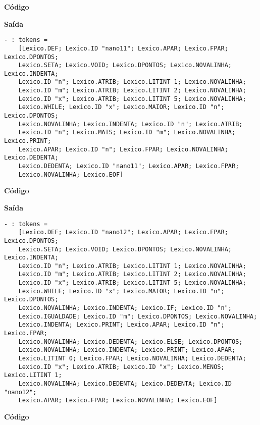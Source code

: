 \documentclass[hidelinks,12pt]{article}
\begin{document}
	{\large \textbf{Código} }
			
	
	{\large \textbf{Saída}}
	
	\begin{lstlisting}[caption=Analisador Léxico]
	- : tokens =
	[Lexico.DEF; Lexico.ID "nano11"; Lexico.APAR; Lexico.FPAR; Lexico.DPONTOS;
	Lexico.SETA; Lexico.VOID; Lexico.DPONTOS; Lexico.NOVALINHA; Lexico.INDENTA;
	Lexico.ID "n"; Lexico.ATRIB; Lexico.LITINT 1; Lexico.NOVALINHA;
	Lexico.ID "m"; Lexico.ATRIB; Lexico.LITINT 2; Lexico.NOVALINHA;
	Lexico.ID "x"; Lexico.ATRIB; Lexico.LITINT 5; Lexico.NOVALINHA;
	Lexico.WHILE; Lexico.ID "x"; Lexico.MAIOR; Lexico.ID "n"; Lexico.DPONTOS;
	Lexico.NOVALINHA; Lexico.INDENTA; Lexico.ID "n"; Lexico.ATRIB;
	Lexico.ID "n"; Lexico.MAIS; Lexico.ID "m"; Lexico.NOVALINHA; Lexico.PRINT;
	Lexico.APAR; Lexico.ID "n"; Lexico.FPAR; Lexico.NOVALINHA; Lexico.DEDENTA;
	Lexico.DEDENTA; Lexico.ID "nano11"; Lexico.APAR; Lexico.FPAR;
	Lexico.NOVALINHA; Lexico.EOF]
	\end{lstlisting}
	
	{\large \textbf{Código} }
			
	
	{\large \textbf{Saída}}
	
	\begin{lstlisting}[caption=Analisador Léxico]
	- : tokens =
	[Lexico.DEF; Lexico.ID "nano12"; Lexico.APAR; Lexico.FPAR; Lexico.DPONTOS;
	Lexico.SETA; Lexico.VOID; Lexico.DPONTOS; Lexico.NOVALINHA; Lexico.INDENTA;
	Lexico.ID "n"; Lexico.ATRIB; Lexico.LITINT 1; Lexico.NOVALINHA;
	Lexico.ID "m"; Lexico.ATRIB; Lexico.LITINT 2; Lexico.NOVALINHA;
	Lexico.ID "x"; Lexico.ATRIB; Lexico.LITINT 5; Lexico.NOVALINHA;
	Lexico.WHILE; Lexico.ID "x"; Lexico.MAIOR; Lexico.ID "n"; Lexico.DPONTOS;
	Lexico.NOVALINHA; Lexico.INDENTA; Lexico.IF; Lexico.ID "n";
	Lexico.IGUALDADE; Lexico.ID "m"; Lexico.DPONTOS; Lexico.NOVALINHA;
	Lexico.INDENTA; Lexico.PRINT; Lexico.APAR; Lexico.ID "n"; Lexico.FPAR;
	Lexico.NOVALINHA; Lexico.DEDENTA; Lexico.ELSE; Lexico.DPONTOS;
	Lexico.NOVALINHA; Lexico.INDENTA; Lexico.PRINT; Lexico.APAR;
	Lexico.LITINT 0; Lexico.FPAR; Lexico.NOVALINHA; Lexico.DEDENTA;
	Lexico.ID "x"; Lexico.ATRIB; Lexico.ID "x"; Lexico.MENOS; Lexico.LITINT 1;
	Lexico.NOVALINHA; Lexico.DEDENTA; Lexico.DEDENTA; Lexico.ID "nano12";
	Lexico.APAR; Lexico.FPAR; Lexico.NOVALINHA; Lexico.EOF]
	\end{lstlisting}
	
	{\large \textbf{Código} }
			
	
\end{document}
